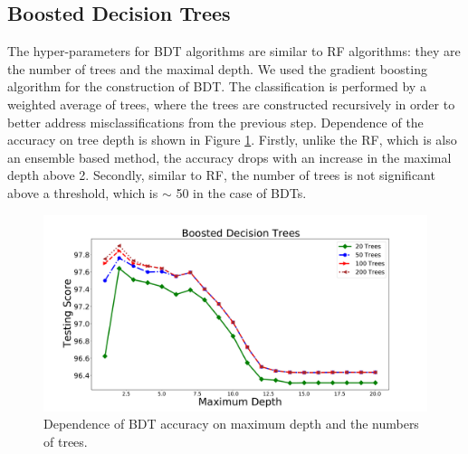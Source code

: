 



\subsection{Boosted Decision Trees}

The hyper-parameters for BDT algorithms are similar to RF algorithms: they are the number of trees and the maximal depth.
We used the gradient boosting algorithm for the construction of BDT.
The classification is performed by a weighted average of trees, where the trees are constructed recursively in order to better address 
misclassifications from the previous step. 
Dependence of the accuracy on tree depth is shown in Figure \ref{fig:BDT_depth}. 
Firstly, unlike the RF, which is also an ensemble based method, the accuracy drops with an increase in the maximal depth above 2. Secondly, similar to RF, the number of trees is not significant above a threshold, which is $\sim$ 50 in the case of BDTs.

\begin{figure}[h]
\includegraphics[width=\twopicsp\textwidth]{plots/bdt_train.pdf}
\caption{Dependence of BDT accuracy on maximum depth and the numbers of trees.}
\label{fig:BDT_depth}
\end{figure}

